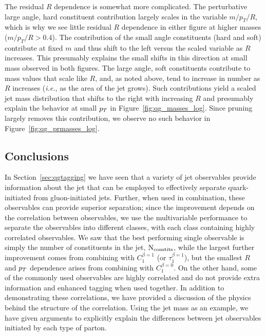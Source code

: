 The residual $R$ dependence is somewhat more complicated.  
The perturbative large angle, hard constituent contribution
largely scales in the variable $m/p_T/R$, which is why we see little residual $R$ dependence in either figure at higher masses ($m/p_T/R > 0.4$).  
The contribution of the small angle constituents (hard and soft) contribute at fixed $m$ and thus shift to the left versus the scaled variable as $R$ increases.  
This presumably explains the small shifts in this direction at small mass observed in both figures.
The large angle, soft constituents contribute to mass values that scale like $R$, and, as noted above, tend to increase in number as $R$ increases 
(\textit{i.e.}, as the area of the jet grows).  Such contributions  yield a scaled jet mass
distribution that shifts to the right with increasing $R$  and presumably explain the behavior at small $p_T$ in Figure~\ref{fig:qg_masses_log}.  Since pruning
largely removes this contribution, we observe no such behavior in Figure~\ref{fig:qg_prmasses_log}. 

 \subsection{Conclusions}\label{sec:qg_concl}

In Section~\ref{sec:qgtagging} we have seen that a variety of jet observables
 provide information about the jet that can be employed  to effectively separate quark-initiated from gluon-initiated jets.  Further,
when used in combination, these observables can provide superior separation; since the improvement depends on the correlation between observables,
we use the multivariable performance to separate the observables into different classes, with each class containing highly correlated observables.  
We saw that the best performing single observable is simply the number of
constituents in the jet, $\rm{N_ {constits}}$,  while the largest further improvement comes from combining with $C_1^{\beta =1}$ (or $\tau_1^{\beta=1}$), 
but the smallest
$R$ and $p_T$ dependence arises from combining with $C_1^{\beta = 0}$.  On the other hand, some of the commonly used observables are highly correlated
and do not provide extra information and enhanced tagging when used together.  In addition to demonstrating these correlations, we have provided a discussion of the 
physics behind the structure of the correlation.  Using the jet mass as an example, we have given arguments to explicitly explain the differences between jet observables 
initiated by each type of parton. 


